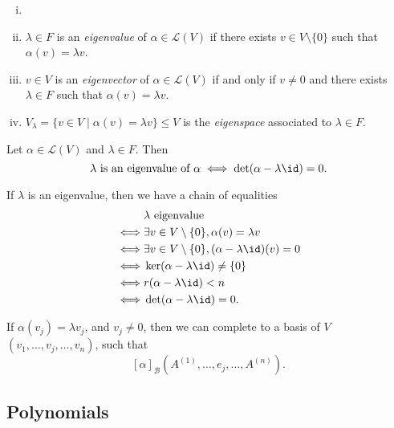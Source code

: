 \documentclass[12pt]{article}
\begin{document}
\begin{definition}
	\begin{enumerate}[(i)]
		\item[]
		\item $\lambda \in F$ is an \textit{eigenvalue} of $\alpha \in \mathcal{L}(V)$ if there exists $v \in V\setminus\{0\}$ such that $\alpha(v) = \lambda v$.
		\item $v \in V$ is an \textit{eigenvector} of $\alpha \in \mathcal{L}(V)$ if and only if $v \neq 0$ and there exists $\lambda \in F$ such that $\alpha(v) = \lambda v$.
		\item $V_{\lambda} = \{v \in V \mid \alpha(v) = \lambda v\} \leq V$ is the \textit{eigenspace} associated to $\lambda \in F$.
	\end{enumerate}
\end{definition}

\begin{lemma}
	Let $\alpha \in \mathcal{L}(V)$ and $\lambda \in F$. Then
	\[
		\lambda \text{ is an eigenvalue of } \alpha \iff \det(\alpha - \lambda \id) = 0
	.\]
\end{lemma}

\begin{proofbox}
	If $\lambda$ is an eigenvalue, then we have a chain of equalities
	\begin{align*}
		& \lambda \text{ eigenvalue} \\
		\iff& \exists v \in V\setminus\{0\}, \alpha(v) = \lambda v \\
			\iff& \exists v \in V \setminus\{0\}, (\alpha - \lambda \id)(v) = 0 \\
			\iff& \ker(\alpha - \lambda \id) \neq \{0\} \\
				\iff& r(\alpha - \lambda \id) < n \\
					\iff& \det(\alpha - \lambda \id) = 0.
	\end{align*}
\end{proofbox}

\begin{remark}
	If $\alpha(v_j) = \lambda v_j$, and $v_j \neq 0$, then we can complete to a basis of $V$ $(v_1, \ldots, v_j, \ldots, v_n)$, such that
	\[
		[\alpha]_{\mathcal{B}} (A^{(1)}, \ldots, e_j, \ldots, A^{(n)})
	.\]
\end{remark}

\subsection{Polynomials}%
\label{sub:polynomials}
\end{document}
